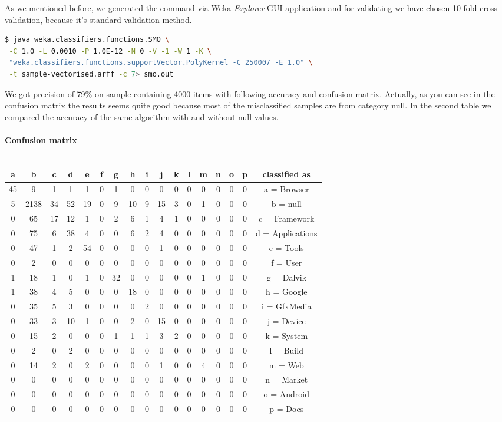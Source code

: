 As we mentioned before, we generated the command via Weka {\it Explorer} GUI application and for validating we have chosen 10 fold cross validation, because it's standard validation method.
\begin{lstlisting}[language=sh]
$ java weka.classifiers.functions.SMO \
 -C 1.0 -L 0.0010 -P 1.0E-12 -N 0 -V -1 -W 1 -K \
 "weka.classifiers.functions.supportVector.PolyKernel -C 250007 -E 1.0" \
 -t sample-vectorised.arff -c 7> smo.out
\end{lstlisting}
 We got precision of 79\% on sample containing 4000 items with following accuracy and confusion matrix.
    Actually, as you can see in the confusion matrix the results seems quite good because most of the misclassified samples are from category null.
   In the second table we compared the accuracy of the same algorithm with and without null values. 
\\
\\
{\bf Confusion matrix}
\\
\\
\begin{tabular}{|cccccccccccccccc|c|}
\hline
a & b & c & d & e & f & g & h & i & j & k & l & m & n & o & p   & classified as\\
\hline
\hline
45 & 9 & 1 & 1 & 1 & 0 & 1 & 0 & 0 & 0 & 0 & 0 & 0 & 0 & 0 & 0 &  a = Browser\\
5&2138 & 34 & 52 & 19 & 0 & 9 & 10 & 9 & 15 & 3 & 0 & 1 & 0 & 0 & 0 &  b = null\\
0 & 65 & 17 & 12 & 1 & 0 & 2 & 6 & 1 & 4 & 1 & 0 & 0 & 0 & 0 & 0 &  c = Framework\\
0 & 75 & 6 & 38 & 4 & 0 & 0 & 6 & 2 & 4 & 0 & 0 & 0 & 0 & 0 & 0 &  d = Applications\\
0 & 47 & 1 & 2 & 54 & 0 & 0 & 0 & 0 & 1 & 0 & 0 & 0 & 0 & 0 & 0 &  e = Tools\\
0 & 2 & 0 & 0 & 0 & 0 & 0 & 0 & 0 & 0 & 0 & 0 & 0 & 0 & 0 & 0 &  f = User\\
1 & 18 & 1 & 0 & 1 & 0 & 32 & 0 & 0 & 0 & 0 & 0 & 1 & 0 & 0 & 0 &  g = Dalvik\\
1 & 38 & 4 & 5 & 0 & 0 & 0 & 18 & 0 & 0 & 0 & 0 & 0 & 0 & 0 & 0 &  h = Google\\
0 & 35 & 5 & 3 & 0 & 0 & 0 & 0 & 2 & 0 & 0 & 0 & 0 & 0 & 0 & 0 &  i = GfxMedia\\
0 & 33 & 3 & 10 & 1 & 0 & 0 & 2 & 0 & 15 & 0 & 0 & 0 & 0 & 0 & 0 &  j = Device\\
0 & 15 & 2 & 0 & 0 & 0 & 1 & 1 & 1 & 3 & 2 & 0 & 0 & 0 & 0 & 0 &  k = System\\
0 & 2 & 0 & 2 & 0 & 0 & 0 & 0 & 0 & 0 & 0 & 0 & 0 & 0 & 0 & 0 &  l = Build\\
0 & 14 & 2 & 0 & 2 & 0 & 0 & 0 & 0 & 1 & 0 & 0 & 4 & 0 & 0 & 0 &  m = Web\\
0 & 0 & 0 & 0 & 0 & 0 & 0 & 0 & 0 & 0 & 0 & 0 & 0 & 0 & 0 & 0 &  n = Market\\
0 & 0 & 0 & 0 & 0 & 0 & 0 & 0 & 0 & 0 & 0 & 0 & 0 & 0 & 0 & 0 &  o = Android\\
0 & 0 & 0 & 0 & 0 & 0 & 0 & 0 & 0 & 0 & 0 & 0 & 0 & 0 & 0 & 0 &  p = Docs\\
\hline
\end{tabular}
\\
\\

